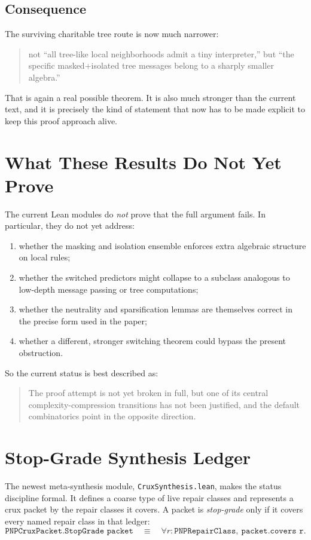 \documentclass[11pt]{article}
\theoremstyle{remark}
\begin{document}
\subsection{Consequence}

The surviving charitable tree route is now much narrower:
\begin{quote}
not ``all tree-like local neighborhoods admit a tiny interpreter,''
but ``the specific masked+isolated tree messages belong to a sharply smaller algebra.''
\end{quote}

That is again a real possible theorem.  It is also much stronger than the current text, and it is
precisely the kind of statement that now has to be made explicit to keep this proof approach alive.

\section{What These Results Do Not Yet Prove}

The current Lean modules do \emph{not} prove that the full argument fails.  In particular,
they do not yet address:
\begin{enumerate}[leftmargin=1.5em]
  \item whether the masking and isolation ensemble enforces extra algebraic structure on local rules;
  \item whether the switched predictors might collapse to a subclass analogous to low-depth message
  passing or tree computations;
  \item whether the neutrality and sparsification lemmas are themselves correct in the precise form
  used in the paper;
  \item whether a different, stronger switching theorem could bypass the present obstruction.
\end{enumerate}

So the current status is best described as:
\begin{quote}
The proof attempt is not yet broken in full, but one of its central complexity-compression
transitions has not been justified, and the default combinatorics point in the opposite direction.
\end{quote}

\section{Stop-Grade Synthesis Ledger}

The newest meta-synthesis module, \texttt{CruxSynthesis.lean}, makes the
status discipline formal.  It defines a coarse type of live repair classes and
represents a crux packet by the repair classes it covers.  A packet is
\emph{stop-grade} only if it covers every named repair class in that ledger:
\[
  \texttt{PNPCruxPacket.StopGrade packet}
  \quad\equiv\quad
  \forall r:\texttt{PNPRepairClass},\ \texttt{packet.covers r}.
\]
\end{document}
